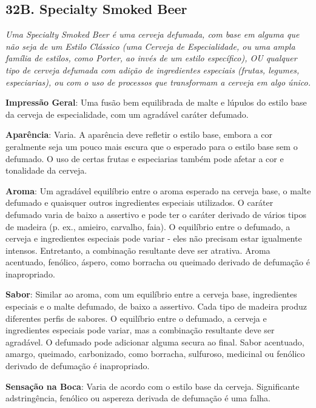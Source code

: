 \subsection*{32B. Specialty Smoked Beer}

\textit{Uma Specialty Smoked Beer é uma cerveja defumada, com base em alguma que não seja de um Estilo Clássico (uma Cerveja de Especialidade, ou uma ampla família de estilos, como Porter, ao invés de um estilo específico), OU qualquer tipo de cerveja defumada com adição de ingredientes especiais (frutas, legumes, especiarias), ou com o uso de processos que transformam a cerveja em algo único.}

\textbf{Impressão Geral}: Uma fusão bem equilibrada de malte e lúpulos do estilo base da cerveja de especialidade, com um agradável caráter defumado.

\textbf{Aparência}: Varia. A aparência deve refletir o estilo base, embora a cor geralmente seja um pouco mais escura que o esperado para o estilo base sem o defumado. O uso de certas frutas e especiarias também pode afetar a cor e tonalidade da cerveja.

\textbf{Aroma}: Um agradável equilíbrio entre o aroma esperado na cerveja base, o malte defumado e quaisquer outros ingredientes especiais utilizados. O caráter defumado varia de baixo a assertivo e pode ter o caráter derivado de vários tipos de madeira (p. ex., amieiro, carvalho, faia). O equilíbrio entre o defumado, a cerveja e ingredientes especiais pode variar - eles não precisam estar igualmente intensos. Entretanto, a combinação resultante deve ser atrativa. Aroma acentuado, fenólico, áspero, como borracha ou queimado derivado de defumação é inapropriado.

\textbf{Sabor}: Similar ao aroma, com um equilíbrio entre a cerveja base, ingredientes especiais e o malte defumado, de baixo a assertivo. Cada tipo de madeira produz diferentes perfis de sabores. O equilíbrio entre o defumado, a cerveja e ingredientes especiais pode variar, mas a combinação resultante deve ser agradável. O defumado pode adicionar alguma secura ao final. Sabor acentuado, amargo, queimado, carbonizado, como borracha, sulfuroso, medicinal ou fenólico derivado de defumação é inapropriado.

\textbf{Sensação na Boca}: Varia de acordo com o estilo base da cerveja. Significante adstringência, fenólico ou aspereza derivada de defumação é uma falha.

